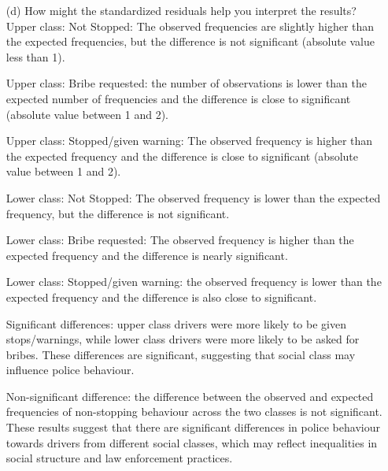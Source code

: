 \documentclass[12pt,letterpaper]{article}
\begin{document}
 \begin{enumerate}
 	\item [(d)]
    How might the standardized residuals help you interpret the results?\\
    
    Upper class: Not Stopped: The observed frequencies are slightly higher than the expected frequencies, but the difference is not significant (absolute value less than 1).
    
    Upper class: Bribe requested: the number of observations is lower than the expected number of frequencies and the difference is close to significant (absolute value between 1 and 2).
    
    Upper class: Stopped/given warning: The observed frequency is higher than the expected frequency and the difference is close to significant (absolute value between 1 and 2).
    
    Lower class: Not Stopped: The observed frequency is lower than the expected frequency, but the difference is not significant.
    
    Lower class: Bribe requested: The observed frequency is higher than the expected frequency and the difference is nearly significant.
    
    Lower class: Stopped/given warning: the observed frequency is lower than the expected frequency and the difference is also close to significant.
    
    Significant differences: upper class drivers were more likely to be given stops/warnings, while lower class drivers were more likely to be asked for bribes. These differences are significant, suggesting that social class may influence police behaviour.
    
    Non-significant difference: the difference between the observed and expected frequencies of non-stopping behaviour across the two classes is not significant.
    These results suggest that there are significant differences in police behaviour towards drivers from different social classes, which may reflect inequalities in social structure and law enforcement practices.\\
 
 \end{enumerate}
 
 \newpage
 
\end{document}
